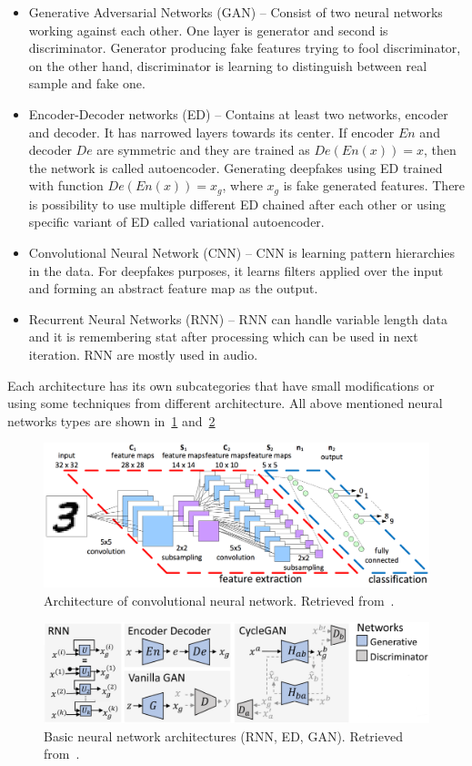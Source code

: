 \begin{itemize}
\item Generative Adversarial Networks (GAN) – Consist of two neural networks working against each other. One layer is generator and second is discriminator. Generator producing fake features trying to fool discriminator, on the other hand, discriminator is learning to distinguish between real sample and fake one.
\item Encoder-Decoder networks (ED) – Contains at least two networks, encoder and decoder. It has narrowed layers towards its center. If encoder \(En\) and decoder \(De\) are symmetric and they are trained as \(De(En(x)) = x\), then the network is called autoencoder. Generating deepfakes using ED trained with function \(De(En(x)) = x_g\), where \(x_g\) is fake generated features. There is possibility to use multiple different ED chained after each other or using specific variant of ED called variational autoencoder.
\item Convolutional Neural Network (CNN) – CNN is learning pattern hierarchies in the data. For deepfakes purposes, it learns filters applied over the input and forming an abstract feature map as the output.
\item Recurrent Neural Networks (RNN) – RNN can handle variable length data and it is remembering stat after processing which can be used in next iteration. RNN are mostly used in audio.
\end{itemize}

Each architecture has its own subcategories that have small modifications or using some techniques from different architecture. All above mentioned neural networks types are shown in~\ref{fig:nns_architecture} and~\ref{fig:cnn_architecture} 

\begin{figure}[H]
    \centering
    \includegraphics[width=.7\linewidth]{other-fig/cnn.png}
    \caption{Architecture of convolutional neural network. Retrieved from~\cite{CNNArchitecture}.}
    \label{fig:nns_architecture}
\end{figure}

\begin{figure}[H]
    \centering
    \includegraphics[width=.65\linewidth]{other-fig/nns.png}
    \caption{Basic neural network architectures (RNN, ED, GAN). Retrieved from~\cite{CreationandDetectionofDeepfakes}.}
\label{fig:cnn_architecture}
\end{figure}

